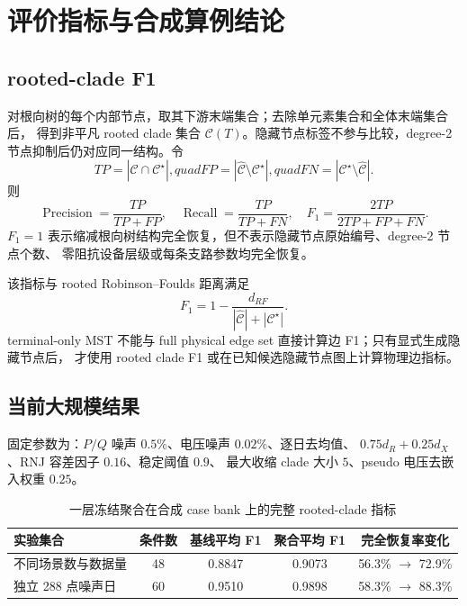 \section{评价指标与合成算例结论}

\subsection{rooted-clade F1}

对根向树的每个内部节点，取其下游末端集合；去除单元素集合和全体末端集合后，
得到非平凡 rooted clade 集合 $\mathcal C(T)$。隐藏节点标签不参与比较，degree-2
节点抑制后仍对应同一结构。令
\[
TP=|\widehat{\mathcal C}\cap\mathcal C^\star|,quad
FP=|\widehat{\mathcal C}\setminus\mathcal C^\star|,quad
FN=|\mathcal C^\star\setminus\widehat{\mathcal C}|.
\]
则
\begin{equation}
  \operatorname{Precision}=\frac{TP}{TP+FP},\quad
  \operatorname{Recall}=\frac{TP}{TP+FN},\quad
  F_1=\frac{2TP}{2TP+FP+FN}.
  \label{eq:clade-f1}
\end{equation}
$F_1=1$ 表示缩减根向树结构完全恢复，但不表示隐藏节点原始编号、degree-2 节点个数、
零阻抗设备层级或每条支路参数均完全恢复。

该指标与 rooted Robinson--Foulds 距离满足
\[
F_1=1-\frac{d_{RF}}{|\widehat{\mathcal C}|+|\mathcal C^\star|}.
\]
terminal-only MST 不能与 full physical edge set 直接计算边 F1；只有显式生成隐藏节点后，
才使用 rooted clade F1 或在已知候选隐藏节点图上计算物理边指标。

\subsection{当前大规模结果}

固定参数为：$P/Q$ 噪声 $0.5\%$、电压噪声 $0.02\%$、逐日去均值、
$0.75d_R+0.25d_X$、RNJ 容差因子 $0.16$、稳定阈值 $0.9$、
最大收缩 clade 大小 $5$、pseudo 电压去嵌入权重 $0.25$。

\begin{table}[htbp]
\centering
\caption{一层冻结聚合在合成 case bank 上的完整 rooted-clade 指标}
\begin{tabular}{lcccc}
\toprule
实验集合 & 条件数 & 基线平均 F1 & 聚合平均 F1 & 完全恢复率变化\\
\midrule
不同场景数与数据量 & 48 & 0.8847 & 0.9073 & 56.3\% $\to$ 72.9\%\\
独立 288 点噪声日 & 60 & 0.9510 & 0.9898 & 58.3\% $\to$ 88.3\%\\
\bottomrule
\end{tabular}
\end{table}

